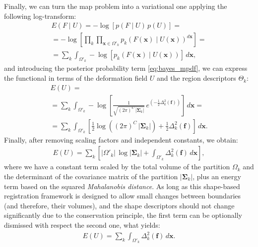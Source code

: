 Finally, we can turn the \gls{map} problem into a variational one
applying the following log-transform:
\begin{multline}
E(F \mid U)= -\log \left[ p(F \mid U) \, p(U) \right] = \\
= -\log \left[ \underset{k}{\prod} \underset{\mathbf{x}\in \Omega'_k}{\prod}
p_k( F(\mathbf{x}) \mid U(\mathbf{x}) )^{d\mathbf{x}} \right] = \\
= \sum\limits_k \int_{\Omega'_k} -\log \left[ p_k(F(\mathbf{x}) \mid U(\mathbf{x} ) ) \right] \, d\mathbf{x},
\label{eq:energy_1}
\end{multline}
and introducing the posterior probability term \eqref{eq:bayes_mpdf}, 
we can express the functional in terms of the deformation field $U$ and
the region descriptors $\Theta_k$:
\begin{multline}
E(U) = \\
= \sum\limits_k \int_{\Omega'_k} -\log \left[ \frac{1}{ \sqrt{(2\pi)^{C}\,\left|\boldsymbol{\Sigma}_{k}\right|}}\,{e^{\left(-\frac{1}{2}  \Delta^2_k (\mathbf{f}) \right)}} \right] \, d\mathbf{x} = \\
= \sum\limits_k \int_{\Omega'_k} \left[ \frac{1}{2} \log{ \left( (2\pi)^{C}\,\left|\boldsymbol{\Sigma}_{k}\right| \right)} + \frac{1}{2}  \Delta^2_k (\mathbf{f}) \right] \,d\mathbf{x}.
\end{multline}
Finally, after removing scaling factors and independent constants,
we obtain:
\begin{align}
E(U) = \sum\limits_k \left[ \left|\Omega'_k\right|\,\log \left|\mathbf{\Sigma}_k \right| + \int_{\Omega'_k} \Delta^2_k (\mathbf{f}) \,d\mathbf{x} \right],
\label{eq:map_energy}
\end{align}
where we have a constant term scaled by the total volume of the partition $\Omega_k$ and 
the determinant of the  covariance matrix of the partition $\left|\boldsymbol{\Sigma}_{k}\right|$,
plus an energy term based on the squared \emph{Mahalanobis distance}.
As long as this shape-based registration framework is designed to allow small changes
between boundaries (and therefore, their volumes), and the shape descriptors should not
change significantly due to the conservation principle, the first term can be optionally
dismissed with respect the second one, what yields:
\begin{align}
E(U) = \sum\limits_k \int_{\Omega'_k} \Delta^2_k (\mathbf{f}) \,d\mathbf{x}.
\label{eq:final_map_energy}
\end{align}

